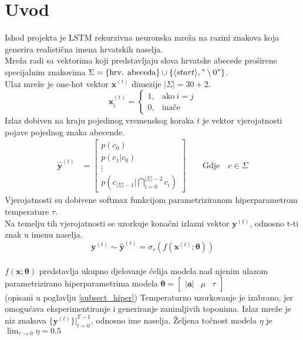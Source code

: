 \documentclass[conference]{IEEEtran}
\begin{document}
\section{Uvod}
Ishod projekta je LSTM rekurzivna neuronska mreža na razini znakova koja generira realistična imena hrvatskih naselja.\\
Mreža radi sa vektorima koji predstavljaju slova hrvatske abecede proširene specijalnim znakovima $\Sigma = \{ \text{hrv. abeceda}\} \cup \{\langle start \rangle, "\setminus 0"\}$.\\
Ulaz mreže je one-hot vektor $\mathbf{x}^{(t)}$ dimezije $\lvert \Sigma \rvert = 30 + 2$.
\begin{equation}
\mathbf{x}^{(t)}_i=
    \begin{cases}
      1, & \text{ako}\ i=j \\
      0, & \text{inače}
    \end{cases}
\end{equation}
Izlaz dobiven na kraju pojedinog vremenskog koraka $t$ je vektor vjerojatnosti pojave pojednog znaka abecende.\\
\begin{align}
    \hat{\mathbf{y}}^{(t)} &= \begin{bmatrix}
           p(c_0) \\
           p(c_1 | c_0) \\
           \vdots \\
           p(c_{\lvert \Sigma \rvert -1} | \bigcap_{i=0}^{\lvert \Sigma \rvert -2} c_i)
         \end{bmatrix}
         \quad \quad \text{Gdje} \quad c \in \Sigma
\end{align}
Vjerojatnosti su dobivene softmax funkcijom parametriziranom hiperparametrom temperature $\tau$.\\
Na temelju tih vjerojatnosti se uzorkuje konačni izlazni vektor $\mathbf{y}^{(t)}$, odnosno t-ti znak u imenu naselja.\\
\begin{equation}
 \mathbf{y}^{(t)} \sim \hat{\mathbf{y}}^{(t)} = \sigma_{\tau}(f(\mathbf{x}^{(t)} ; \boldsymbol{\theta}))
\end{equation}
\ \\
$f(\mathbf{x} ; \boldsymbol{\theta})$ predstavlja ukupno djelovanje ćelija modela nad njenim ulazom parametrizirano hiperparametrima modela $\boldsymbol{\theta} = \begin{bmatrix} \lvert \mathbf{a} \rvert & \mu & \tau \end{bmatrix}$\\ (opisani u poglavlju \ref{subsect_hiper})
Temperaturno uzorkovanje je izabrano, jer omogućava eksperimentiranje i generiranje zanimljivih toponima.
Izlaz mreže je niz znakova $\{\mathbf{y}^{(t)}\} \biggr \rvert_{t=0}^{T-1}$, odnosno ime naselja.
Željena točnost modela $\eta$ je $\lim_{\tau \to 0} \eta = 0.5$
\end{document}
